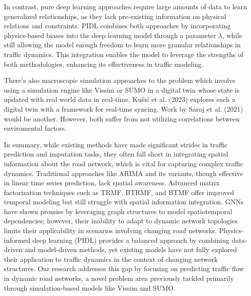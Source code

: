 In contrast, pure deep learning approaches require large amounts of data to learn generalized relationships, as they lack pre-existing information on physical relations and constraints. PIDL combines both approaches by incorporating physics-based biases into the deep learning model through a parameter \(\lambda\), while still allowing the model enough freedom to learn more granular relationships in traffic dynamics. This integration enables the model to leverage the strengths of both methodologies, enhancing its effectiveness in traffic modeling.

There's also macroscopic simulation approaches to the problem which involve using a simulation engine like Vissim\cite{vissim} or SUMO\cite{sumo} in a digital twin whose state is updated with real world data in real-time. Kušić et al. (2023)\cite{kusic2023digital} explores such a digital twin with a framework for real-time syncing. Work by Saroj et al. (2021)\cite{saroj2021development}
would be another. However, both suffer from not utilizing correlations between enviromental factors.

In summary, while existing methods have made significant strides in traffic prediction and imputation tasks, they often fall short in integrating spatial information about the road network, which is vital for capturing complex traffic dynamics. Traditional approaches like ARIMA and its variants, though effective in linear time series prediction, lack spatial awareness. Advanced matrix factorization techniques such as TRMF, BTRMF, and BTMF offer improved temporal modeling but still struggle with spatial information integration. GNNs have shown promise by leveraging graph structures to model spatiotemporal dependencies; however, their inability to adapt to dynamic network topologies limits their applicability in scenarios involving changing road networks. Physics-informed deep learning (PIDL) provides a balanced approach by combining data-driven and model-driven methods, yet existing models have not fully explored their application to traffic dynamics in the context of changing network structures. Our research addresses this gap by focusing on predicting traffic flow in dynamic road networks, a novel problem area previously tackled primarily through simulation-based models like Vissim\cite{vissim} and SUMO\cite{sumo}.